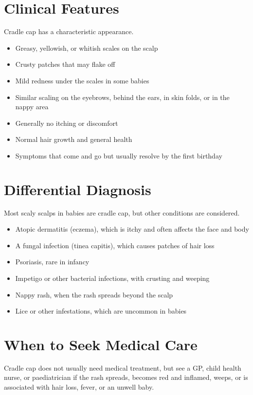 \section*{Clinical Features}
Cradle cap has a characteristic appearance.

\begin{itemize}
    \item Greasy, yellowish, or whitish scales on the scalp
    \item Crusty patches that may flake off
    \item Mild redness under the scales in some babies
    \item Similar scaling on the eyebrows, behind the ears, in skin folds, or in the nappy area
    \item Generally no itching or discomfort
    \item Normal hair growth and general health
    \item Symptoms that come and go but usually resolve by the first birthday
\end{itemize}

\section*{Differential Diagnosis}
Most scaly scalps in babies are cradle cap, but other conditions are considered.

\begin{itemize}
    \item Atopic dermatitis (eczema), which is itchy and often affects the face and body
    \item A fungal infection (tinea capitis), which causes patches of hair loss
    \item Psoriasis, rare in infancy
    \item Impetigo or other bacterial infections, with crusting and weeping
    \item Nappy rash, when the rash spreads beyond the scalp
    \item Lice or other infestations, which are uncommon in babies
\end{itemize}

\section*{When to Seek Medical Care}
Cradle cap does not usually need medical treatment, but see a GP, child health nurse, or paediatrician if the rash spreads, becomes red and inflamed, weeps, or is associated with hair loss, fever, or an unwell baby.

